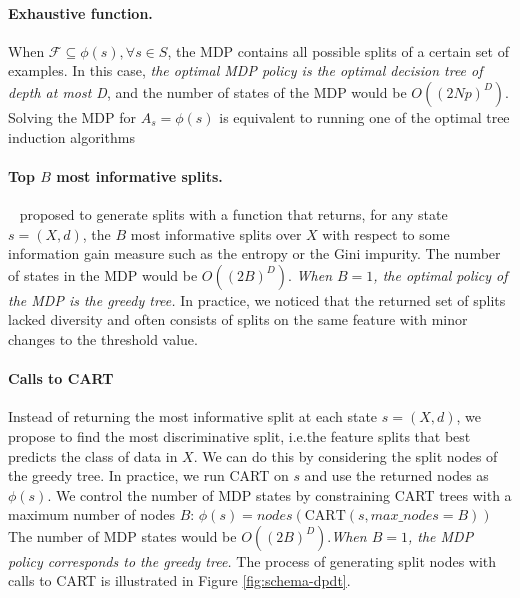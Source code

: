 \paragraph{Exhaustive function.} When $\mathcal{F} \subseteq \phi(s), \forall s \in S$, the MDP contains all possible splits of a certain set of examples. In this case, \textit{the optimal MDP policy is the optimal decision tree of depth at most D},
and the number of states of the MDP would be $O({(2Np)}^D)$. Solving the MDP for $A_s = \phi(s)$ is equivalent to running one of the optimal tree induction algorithms~\cite{verwer2017learning,oct,pystreed,quantbnb,binoct,murtree,mfoct,blossom,lin2020generalized,chaouki2024branchesfastdynamicprogramming}

\paragraph{Top $B$ most informative splits.}\label{topk-heuristic}~\cite{topk} proposed to generate splits with a function that returns, for any state $s=(X,d)$, the $B$ most informative splits over $X$ with respect to some information gain measure such as the entropy or the Gini impurity. 
The number of states in the MDP would be $O({(2B)}^D)$. \textit{When $B=1$, the optimal policy of the MDP is the greedy tree.} 
In practice, we noticed that the returned set of splits lacked diversity and often consists of splits on the same feature with minor changes to the threshold value. 

\paragraph{Calls to CART}\label{cart-heuristic} Instead of returning the most informative split at each state $s=(X,d)$, we propose to find the most discriminative split, i.e.\@ the feature splits that best predicts the class of data in $X$.
We can do this by considering the split nodes of the greedy tree. In practice, we run CART on $s$ and use the returned nodes as $\phi(s)$. We control the number of MDP states by constraining CART trees with a maximum number of nodes $B$: $\phi(s) = nodes(\text{CART}(s, max\_nodes=B))$
The number of MDP states would be $O({(2B)}^D)$.\textit{When $B=1$, the MDP policy corresponds to the greedy tree.} The process of generating split nodes with calls to CART is illustrated in Figure \ref{fig:schema-dpdt}.

